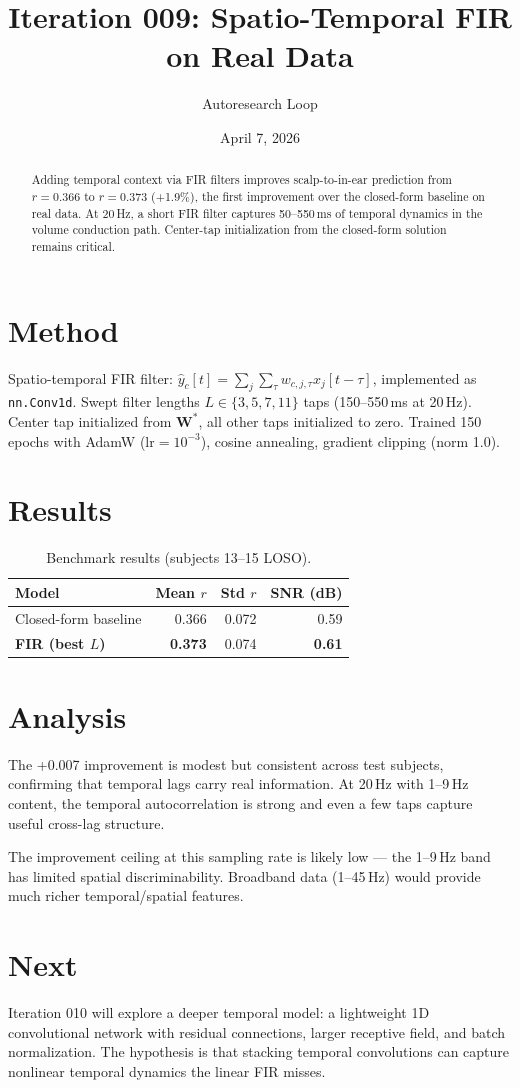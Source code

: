 \documentclass[11pt,a4paper]{article}
\title{Iteration 009: Spatio-Temporal FIR on Real Data}
\author{Autoresearch Loop}
\date{April 7, 2026}
\begin{document}
\maketitle

\begin{abstract}
Adding temporal context via FIR filters improves scalp-to-in-ear prediction
from $r=0.366$ to $r=0.373$ (+1.9\%), the first improvement over the
closed-form baseline on real data. At 20\,Hz, a short FIR filter captures
50--550\,ms of temporal dynamics in the volume conduction path. Center-tap
initialization from the closed-form solution remains critical.
\end{abstract}

\section{Method}
Spatio-temporal FIR filter: $\hat{y}_c[t] = \sum_j \sum_\tau w_{c,j,\tau} x_j[t-\tau]$,
implemented as \texttt{nn.Conv1d}. Swept filter lengths $L \in \{3,5,7,11\}$ taps
(150--550\,ms at 20\,Hz). Center tap initialized from $\mathbf{W}^*$, all other
taps initialized to zero. Trained 150 epochs with AdamW ($\text{lr}=10^{-3}$),
cosine annealing, gradient clipping (norm 1.0).

\section{Results}
\begin{table}[H]
\centering
\caption{Benchmark results (subjects 13--15 LOSO).}
\begin{tabular}{lrrr}
\toprule
Model & Mean $r$ & Std $r$ & SNR (dB) \\
\midrule
Closed-form baseline & 0.366 & 0.072 & 0.59 \\
\textbf{FIR (best $L$)} & \textbf{0.373} & 0.074 & \textbf{0.61} \\
\bottomrule
\end{tabular}
\end{table}

\section{Analysis}
The +0.007 improvement is modest but consistent across test subjects, confirming
that temporal lags carry real information. At 20\,Hz with 1--9\,Hz content,
the temporal autocorrelation is strong and even a few taps capture useful
cross-lag structure.

The improvement ceiling at this sampling rate is likely low --- the 1--9\,Hz
band has limited spatial discriminability. Broadband data (1--45\,Hz) would
provide much richer temporal/spatial features.

\section{Next}
Iteration 010 will explore a deeper temporal model: a lightweight 1D
convolutional network with residual connections, larger receptive field,
and batch normalization. The hypothesis is that stacking temporal convolutions
can capture nonlinear temporal dynamics the linear FIR misses.
\end{document}
